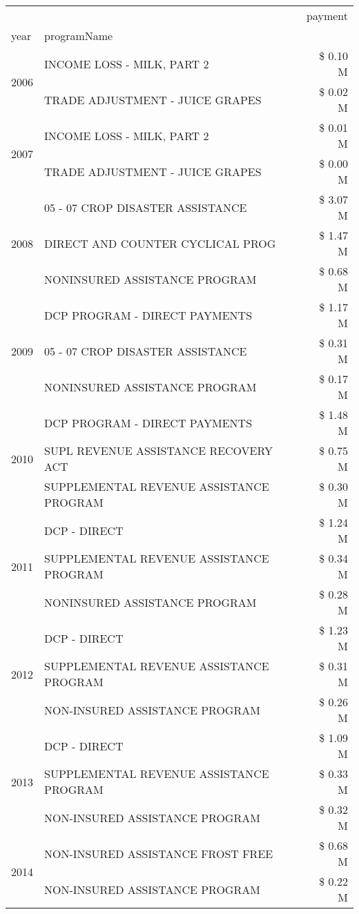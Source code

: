 \begin{tabular}{llr}
\toprule
 &  & payment \\
year & programName &  \\
\midrule
\multirow[t]{2}{*}{2006} & INCOME LOSS - MILK, PART 2 & \$ 0.10 M \\
 & TRADE ADJUSTMENT - JUICE GRAPES & \$ 0.02 M \\
\cline{1-3}
\multirow[t]{2}{*}{2007} & INCOME LOSS - MILK, PART 2 & \$ 0.01 M \\
 & TRADE ADJUSTMENT - JUICE GRAPES & \$ 0.00 M \\
\cline{1-3}
\multirow[t]{3}{*}{2008} & 05 - 07 CROP DISASTER ASSISTANCE & \$ 3.07 M \\
 & DIRECT AND COUNTER CYCLICAL PROG & \$ 1.47 M \\
 & NONINSURED ASSISTANCE PROGRAM & \$ 0.68 M \\
\cline{1-3}
\multirow[t]{3}{*}{2009} & DCP PROGRAM - DIRECT PAYMENTS & \$ 1.17 M \\
 & 05 - 07 CROP DISASTER ASSISTANCE & \$ 0.31 M \\
 & NONINSURED ASSISTANCE PROGRAM & \$ 0.17 M \\
\cline{1-3}
\multirow[t]{3}{*}{2010} & DCP PROGRAM - DIRECT PAYMENTS & \$ 1.48 M \\
 & SUPL REVENUE ASSISTANCE RECOVERY ACT & \$ 0.75 M \\
 & SUPPLEMENTAL REVENUE ASSISTANCE PROGRAM & \$ 0.30 M \\
\cline{1-3}
\multirow[t]{3}{*}{2011} & DCP - DIRECT & \$ 1.24 M \\
 & SUPPLEMENTAL REVENUE ASSISTANCE PROGRAM & \$ 0.34 M \\
 & NONINSURED ASSISTANCE PROGRAM & \$ 0.28 M \\
\cline{1-3}
\multirow[t]{3}{*}{2012} & DCP - DIRECT & \$ 1.23 M \\
 & SUPPLEMENTAL REVENUE ASSISTANCE PROGRAM & \$ 0.31 M \\
 & NON-INSURED ASSISTANCE PROGRAM & \$ 0.26 M \\
\cline{1-3}
\multirow[t]{3}{*}{2013} & DCP - DIRECT & \$ 1.09 M \\
 & SUPPLEMENTAL REVENUE ASSISTANCE PROGRAM & \$ 0.33 M \\
 & NON-INSURED ASSISTANCE PROGRAM & \$ 0.32 M \\
\cline{1-3}
\multirow[t]{3}{*}{2014} & NON-INSURED ASSISTANCE FROST FREE & \$ 0.68 M \\
 & NON-INSURED ASSISTANCE PROGRAM & \$ 0.22 M \\

\end{tabular}
